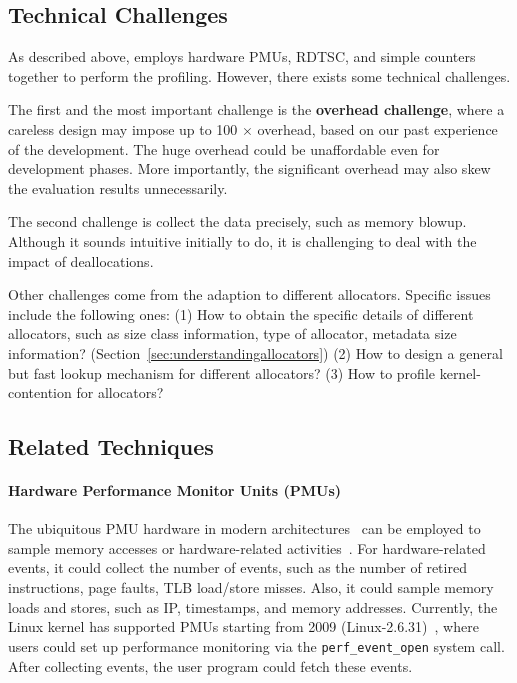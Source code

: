 
\subsection{Technical Challenges}

As described above, \MP{} employs hardware PMUs, RDTSC, and simple counters together to perform the profiling. However, there exists some technical challenges. 

The first and the most important challenge is the \textbf{overhead challenge}, where a careless design may impose up to 100 $\times$ overhead, based on our past experience of the development. The huge overhead could be unaffordable even for development phases. More importantly, the significant overhead may also skew the evaluation results unnecessarily. 

The second challenge is collect the data precisely, such as memory blowup. Although it sounds intuitive initially to do, it is challenging to deal with the impact of deallocations. 

Other challenges come from the adaption to different allocators. Specific issues include the following ones: (1) How to obtain the specific details of different allocators, such as size class information, type of allocator, metadata size information? (Section~\ref{sec:understandingallocators}) (2) How to design a general but fast lookup mechanism for different allocators? (3) How to profile kernel-contention for allocators?


\subsection{Related Techniques}
\label{sec:pmu}

\paragraph{Hardware Performance Monitor Units (PMUs)} The ubiquitous PMU hardware in modern architectures~\cite{AMDIBS:07, IntelArch:PEBS:Sept09, armpmu} can be employed to sample memory accesses or hardware-related activities~\cite{DBLP:conf/sc/ItzkowitzWAK03, ibs-sc, ibs-pact, Sheng:2011:RLN:1985793.1985848, LASER, Cheetah}. For hardware-related events, it could collect the number of events, such as the number of retired instructions, page faults, TLB load/store misses. Also, it could sample  memory loads and stores, such as IP, timestamps, and memory addresses. Currently, the Linux kernel has supported PMUs starting from 2009 (Linux-2.6.31)~\cite{pmulinuxsupport}, where users could set up performance monitoring via  the \texttt{perf\_event\_open} system call. After collecting events, the user program could fetch these events. 

